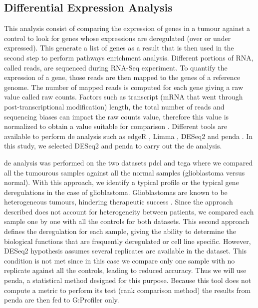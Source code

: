 \subsection{Differential Expression Analysis}

This analysis consist of comparing the expression of genes in a tumour against a control to look for genes whose expressions are deregulated (over or under expressed).
This generate a list of genes as a result that is then used in the second step to perform pathways enrichment analysis.
Different portions of RNA, called reads, are sequenced during RNA-Seq experiment.
To quantify the expression of a gene, those reads are then mapped to the genes of a reference genome.
The number of mapped reads is computed for each gene giving a raw value called raw counts.
Factors such as transcript (mRNA that went through post-transcriptional modification) length, the total number of reads and sequencing biases can impact the raw counts value, therefore this value is normalized to obtain a value suitable for comparison \cite*{Conesa2016}.
Different tools are available to perform \acrshort{de} analysis such as edgeR \cite*{Robinson2010}, Limma \cite*{Ritchie2015}, DESeq2 \cite*{Love2014} and \acrshort{penda} \cite*{Richard2020}.
In this study, we selected DESeq2 \cite*{Love2014} and \acrfull{penda} to carry out the \acrshort{de} analysis.

\acrshort{de} analysis was performed on the two datasets \acrshort{pdcl} and \acrshort{tcga} where we compared all the tumourous samples against all the normal samples (glioblastoma versus normal).
With this approach, we identify a typical profile or the typical gene deregulations in the case of glioblastoma.
Glioblastomas are known to be heterogeneous tumours, hindering therapeutic success \cite*{Neftel2019,Delgado-Lopez2016, Quinones2018}.
Since the approach described does not account for heterogeneity between patients, we compared each sample one by one with all the controls for both datasets.
This second approach defines the deregulation for each sample, giving the ability to determine the biological functions that are frequently deregulated or cell line specific.
However, DESeq2 hypothesis assumes several replicates are available in the dataset.
This condition is not met since in this case we compare only one sample with no replicate against all the controls, leading to reduced accuracy.
Thus we will use \acrshort{penda}, a statistical method designed for this purpose.
Because this tool does not compute a metric to perform its test (rank comparison method) the results from \acrshort{penda} are then fed to G:Profiler only.

